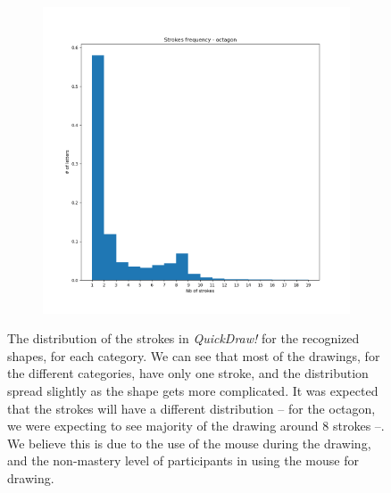 \begin{figure}
\begin{subfigure}{0.3\textwidth}
    \end{subfigure}
    ~
    \begin{subfigure}{0.3\textwidth}
        \includegraphics[scale=0.28]{images/dataset/strokes_frequency_octagon.png}
    \end{subfigure}

    \caption{The distribution of the strokes in \textit{QuickDraw!} for the recognized shapes, for each category. We can see that most of the drawings, for the different categories, have only one stroke, and the distribution spread slightly as the shape gets more complicated. It was expected that the strokes will have a different distribution -- for the octagon, we were expecting to see majority of the drawing around 8 strokes --. We believe this is due to the use of the mouse during the drawing, and the non-mastery level of participants in using the mouse for drawing.}

    \label{fig:stroke_count}
\end{figure}

